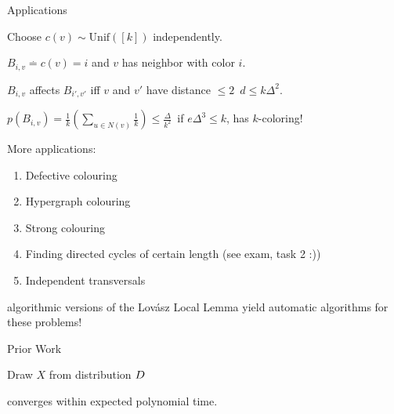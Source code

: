 \documentclass{beamer}
\def\padding{\vspace{0.5cm}}
\newcommand*{\defeq}{\overset{.}{=}}
\begin{document}
\begin{frame}{Applications}
\begin{example}[k-Coloring]
Choose $c(v) \sim \text{Unif}([k])$ independently.\pause\par
$B_{i,v} \defeq c(v) = i$ and $v$ has neighbor with color $i$.\par
$B_{i,v}$ affects $B_{i',v'}$ iff $v$ and $v'$ have distance $\leq 2$\pause\ \follows $d \leq k \Delta^2$.\pause\par
$p(B_{i,v}) = \frac{1}{k}(\sum_{u \in N(v)} \frac{1}{k}) \leq \frac{\Delta}{k^2}$\pause\ \follows if $e \Delta^3 \leq k$, has $k$-coloring!
\end{example}\pause\padding

More applications:
\begin{enumerate}
    \item Defective colouring 
    \item Hypergraph colouring
    \item Strong colouring
    \item Finding directed cycles of certain length (see exam, task 2 :))
    \item Independent transversals
\end{enumerate}\pause

\follows algorithmic versions of the Lovász Local Lemma yield automatic algorithms for these problems!
\end{frame}

\begin{frame}{Prior Work}
\begin{algorithm}[H]
    Draw $X$ from distribution $D$\;
\end{algorithm}\pause
\follows converges within expected polynomial time.
\end{frame}
\end{document}
